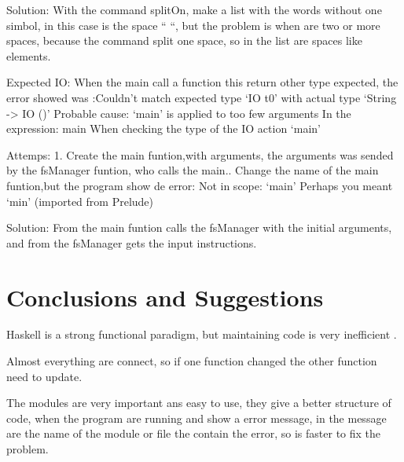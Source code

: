 \documentclass{aes2e}
\begin{document}
\begin{paralist}
Solution: With the command splitOn, make a list with the words without one simbol, in this case is the space “ “, but the problem is when are two or more spaces, because the command split one space, so in the list are spaces like elements.\newline\newline

\item{}Expected IO: When the main call a function this return other type   expected, the error showed was :\newline Couldn't match expected type ‘IO t0’\newline
                with actual type ‘String -> IO ()’\newline
    Probable cause: ‘main’ is applied to too few arguments\newline
    In the expression: main\newline
    When checking the type of the IO action ‘main’\newline

Attemps: 1. Create the main funtion,with arguments, the arguments was sended by the fsManager funtion, who calls the main.. Change the name of the main funtion,but the program show de error: Not in scope: ‘main’ Perhaps you meant ‘min’ (imported from Prelude)\newline

Solution: From the main funtion calls the fsManager with the initial arguments, and     from the fsManager gets the input instructions.\newline
\end{paralist}


\section{Conclusions and Suggestions}
Haskell is a strong functional paradigm, but  maintaining code is very inefficient .\newline

Almost everything are connect, so if one function changed the other function need to update.\newline

The modules are very important ans easy to use, they give a better structure of code, when the program are running and show a error message, in the message are the name of the module or file the contain the error, so is faster to fix the problem.\newline
\end{document}
